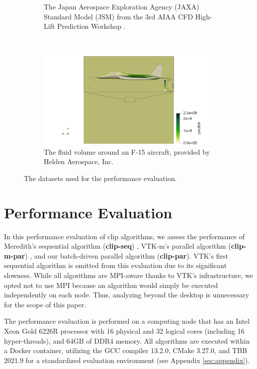 \documentclass{egpubl}
\begin{document}
\begin{figure}[H]
\begin{subfigure}[t]{0.957\linewidth}
    \caption{The Japan Aerospace Exploration Agency (JAXA) Standard Model (JSM) from the 3rd AIAA CFD High-Lift Prediction Workshop \cite{JAXAModel}.}
  \end{subfigure}
  \\
  \begin{subfigure}[t]{0.957\linewidth}
    \centering
    \includegraphics[width=\linewidth]{Figures/F15.png}
    \caption{The fluid volume around an F-15 aircraft, provided by Helden Aerospace, Inc.}
  \end{subfigure}
  \caption{The datasets used for the performance evaluation.}
  \label{fig:datasets}
\end{figure}

\section{Performance Evaluation}
\label{sec:perf-eval}

In this performance evaluation of clip algorithms, we assess the performance of Meredith's sequential algorithm (\textbf{clip-seq}) \cite{Clip}, VTK-m's parallel algorithm (\textbf{clip-m-par}) \cite{VTKm}, and our batch-driven parallel algorithm (\textbf{clip-par}). VTK's first sequential algorithm \cite{VTK} is omitted from this evaluation due to its significant slowness. While all algorithms are MPI-aware thanks to VTK's infrastructure, we opted not to use MPI because an algorithm would simply be executed independently on each node. Thus, analyzing beyond the desktop is unnecessary for the scope of this paper.

The performance evaluation is performed on a computing node that has an Intel Xeon Gold 6226R processor with 16 physical and 32 logical cores (including 16 hyper-threads), and 64GB of DDR4 memory. All algorithms are executed within a Docker container, utilizing the GCC compiler 13.2.0, CMake 3.27.0, and TBB 2021.9 for a standardized evaluation environment  (see Appendix \ref{sec:appendix}).
\end{document}
